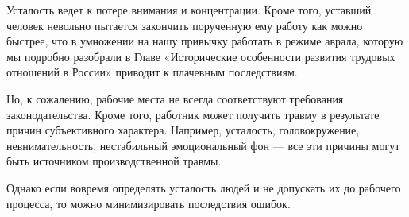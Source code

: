 \documentclass[12pt, letterpaper]{article}
\begin{document}
    Усталость ведет к потере внимания и концентрации.
    Кроме того, уставший человек невольно пытается закончить порученную ему работу как можно быстрее, что в умножении на нашу привычку работать в режиме аврала, которую мы подробно разобрали в Главе «Исторические особенности развития трудовых отношений в России» приводит к плачевным последствиям.

    Но, к сожалению, рабочие места не всегда соответствуют требования законодательства.
    Кроме того, работник может получить травму в результате причин субъективного характера.
    Например, усталость, головокружение, невнимательность, нестабильный эмоциональный фон — все эти причины могут быть источником производственной травмы.

    Однако если вовремя определять усталость людей и не допускать их до рабочего процесса, то можно минимизировать последствия ошибок.

    \begin{refsection}
        \nocite{*}
        \printbibliography
    \end{refsection}
\end{document}
